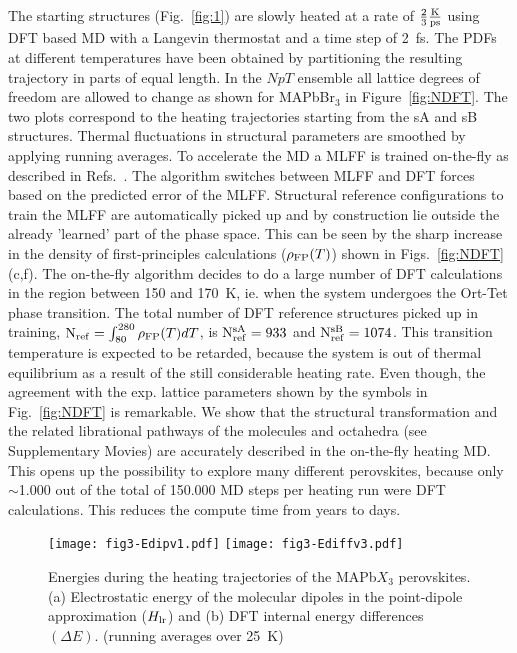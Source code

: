\documentclass[journal=jpccck,manuscript=article,layout=twocolumn]{achemso}
\begin{document}
The starting structures (Fig.~\ref{fig:1}) are slowly heated at a rate of $\frac{2}{3}\frac{\rm K}{\rm ps}$ using DFT based MD with a Langevin thermostat and a time step of 2~fs. The PDFs at different temperatures have been obtained by partitioning the resulting trajectory in parts of equal length. In the $NpT$ ensemble all lattice degrees of freedom are allowed to change as shown for MAPbBr$_3$ in Figure~\ref{fig:NDFT}. The two plots correspond to the heating trajectories starting from the sA and sB structures. Thermal fluctuations in structural parameters are smoothed by applying running averages. To accelerate the MD a MLFF is trained on-the-fly as described in Refs.~\cite{Jinnouchi:prl19,Jinnouchi:prb19}. The algorithm switches between MLFF and DFT forces based on the predicted error of the MLFF. Structural reference configurations to train the MLFF are automatically picked up and by construction lie outside the already 'learned' part of the phase space. This can be seen by the sharp increase in the density of first-principles calculations ($\rho_{\rm FP}(T)$) shown in Figs.~\ref{fig:NDFT}(c,f). The on-the-fly algorithm decides to do a large number of DFT calculations in the region between 150 and 170~K, ie. when the system undergoes the Ort-Tet phase transition. The total number of DFT reference structures picked up in training,  ${\rm N_{ref}}=\int_{80}^{280} \rho_{\rm FP}(T)dT$, is ${\rm N_{ref}^{sA}}=933$ and ${\rm N_{ref}^{sB}}=1074$. This transition temperature is expected to be retarded, because the system is out of thermal equilibrium as a result of the still considerable heating rate. Even though, the agreement with the exp. lattice parameters shown by the symbols in Fig.~\ref{fig:NDFT} is remarkable. We show that the structural transformation and the related librational pathways of the molecules and octahedra (see Supplementary Movies) are accurately described in the on-the-fly heating MD. This opens up the possibility to explore many different perovskites, because only $\sim$1.000 out of the total of 150.000 MD steps per heating run were DFT calculations. This reduces the compute time from years to days.\newline{}




\begin{figure}
    \begin{center}
    \texttt{[image: fig3-Edipv1.pdf]}
    \texttt{[image: fig3-Ediffv3.pdf]}
    \end{center}
   \caption{Energies during the heating trajectories of the MAPb$X_3$ perovskites. (a) Electrostatic energy of the molecular dipoles in the point-dipole approximation ($H_{\rm lr}$) and (b) DFT internal energy differences $(\Delta E)$. (running averages over 25~K)}
\label{fig:2}
\end{figure}
\end{document}
